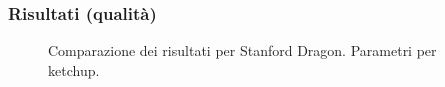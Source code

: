 \documentclass{beamer}
\begin{document}
\begin{frame}
    \frametitle{Risultati (qualità)}
				\begin{figure}
\centering
{}
\vspace{-0.2cm}
\caption{Comparazione dei risultati per Stanford Dragon. Parametri per ketchup.}
\end{figure}

\end{frame}
\end{document}
